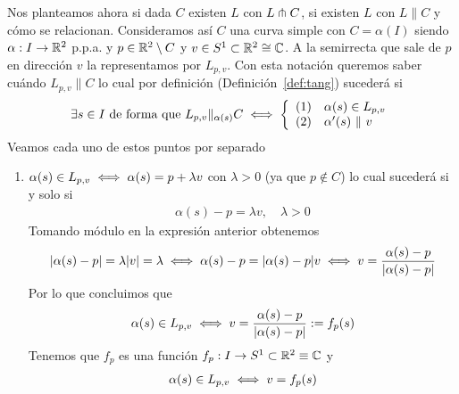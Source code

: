 \begin{observacion}
    Nos planteamos ahora si dada $C$ existen $L$ con $L\pitchfork C$, si existen $L$ con $L\|C$ y cómo se relacionan. Consideramos así $C$ una curva simple con $C=\alpha(I)$ siendo $\alpha: I \to \mathbb{R}^2$ p.p.a. y $p\in \mathbb{R}^2 \setminus C$ y $v\in S^1\subset \mathbb{R}^2 \cong \mathbb{C}$. A la semirrecta que sale de $p$ en dirección $v$ la representamos por $L_{p,v}$. Con esta notación queremos saber cuándo $L_{p,v} \| C$ lo cual por definición (Definición~\ref{def:tang}) sucederá si
    \begin{gather*}
        \exists s \in I \text{ de forma que } L_{p,v} \|_{\alpha(s)} C \iff \left\{ 
            \begin{array}{c l}
                (1) & \alpha(s)\in L_{p,v}\\
                (2) & \alpha'(s)\ \| \ v
            \end{array}
        \right.
    \end{gather*}
    Veamos cada uno de estos puntos por separado
    \begin{enumerate}[label=(\arabic*)]
        \item $\alpha(s) \in L_{p,v} \iff \alpha(s) = p + \lambda v$ con $\lambda > 0$ (ya que $p\notin C$) lo cual sucederá si y solo si 
        \begin{gather*}
            \alpha(s) - p = \lambda v,\quad \lambda > 0
        \end{gather*}
        Tomando módulo en la expresión anterior obtenemos
        \begin{gather*}
            |\alpha(s) - p| = \lambda |v| = \lambda \iff \alpha(s) - p = |\alpha(s) - p |v \iff v = \frac{\alpha(s)-p}{|\alpha(s)-p|}
        \end{gather*}
        Por lo que concluimos que 
        \begin{gather*}
            \alpha(s) \in L_{p,v} \iff v = \frac{\alpha(s)-p}{|\alpha(s)-p|} := f_p(s)
        \end{gather*}
        Tenemos que $f_p$ es una función $f_p:I \to S^1 \subset \mathbb{R}^2 \equiv \mathbb{C}$ y
        \begin{gather*}
            \alpha(s) \in L_{p,v} \iff v = f_p(s)
        \end{gather*}


\end{enumerate}
\end{observacion}
